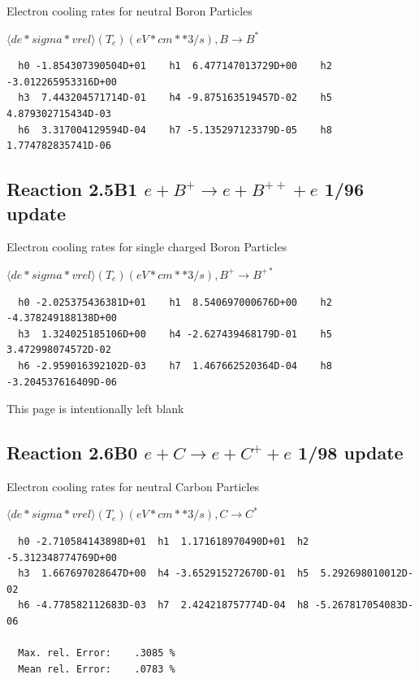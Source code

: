 \documentclass[12pt,dvips]{article}
\begin{document}
 Electron cooling rates for neutral
 Boron Particles

$  \langle de*sigma*vrel \rangle(T_e)  (eV*cm**3/s), B   \rightarrow B^* $


\begin{small}\begin{verbatim}
  h0 -1.854307390504D+01    h1  6.477147013729D+00    h2 -3.012265953316D+00
  h3  7.443204571714D-01    h4 -9.875163519457D-02    h5  4.879302715434D-03
  h6  3.317004129594D-04    h7 -5.135297123379D-05    h8  1.774782835741D-06
\end{verbatim}\end{small}

\subsection{
Reaction 2.5B1 $e + B^+ \rightarrow e + B^{++} + e $ 1/96 update
}

 Electron cooling rates for single
 charged Boron Particles

 $ \langle de*sigma*vrel \rangle(T_e)  (eV*cm**3/s), B^+ \rightarrow B^{+*} $


\begin{small}\begin{verbatim}
  h0 -2.025375436381D+01    h1  8.540697000676D+00    h2 -4.378249188138D+00
  h3  1.324025185106D+00    h4 -2.627439468179D-01    h5  3.472998074572D-02
  h6 -2.959016392102D-03    h7  1.467662520364D-04    h8 -3.204537616409D-06
\end{verbatim}\end{small}

\newpage
This page is intentionally left blank
\newpage

\subsection{
Reaction 2.6B0 $e + C \rightarrow e + C^+ + e  $ 1/98 update
}

 Electron cooling rates for neutral
 Carbon Particles

$  \langle de*sigma*vrel \rangle(T_e)  (eV*cm**3/s), C   \rightarrow C^* $


\begin{small}\begin{verbatim}
  h0 -2.710584143898D+01  h1  1.171618970490D+01  h2 -5.312348774769D+00
  h3  1.667697028647D+00  h4 -3.652915272670D-01  h5  5.292698010012D-02
  h6 -4.778582112683D-03  h7  2.424218757774D-04  h8 -5.267817054083D-06

  Max. rel. Error:    .3085 %
  Mean rel. Error:    .0783 %

\end{verbatim}\end{small}
\end{document}
